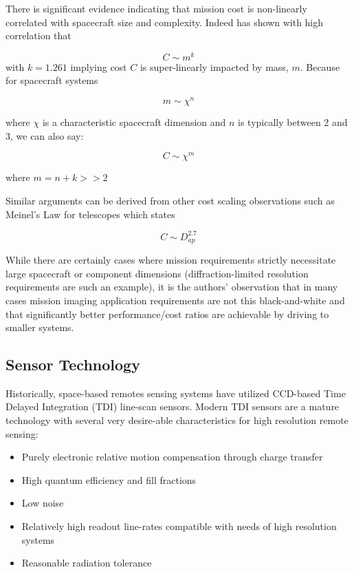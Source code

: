 \documentclass[10pt,journal]{IEEEtran}  %
\begin{document}
There is significant evidence indicating that mission cost is non-linearly correlated with spacecraft size and complexity.  Indeed \cite{bearden} has shown with high correlation that 

$$C \sim m^k$$
with $k=1.261$ implying cost $C$ is super-linearly impacted by mass, $m$.  Because for spacecraft systems

$$m \sim \chi^n$$

where $\chi$ is a characteristic spacecraft dimension and $n$ is typically between 2 and 3, we can also say:

\begin{equation}
C \sim \chi^m
\end{equation}

where $m = n + k >> 2$

Similar arguments can be derived from other cost scaling observations such as Meinel's Law for telescopes which states

$$C \sim D_{ap}^{2.7}$$

While there are certainly cases where mission requirements strictly necessitate large spacecraft or component dimensions (diffraction-limited resolution requirements are such an example), it is the authors' observation that in many cases mission imaging application requirements are not this black-and-white and that significantly better performance/cost ratios are achievable by driving to smaller systems.

\subsection{Sensor Technology}
\label{sec:sensor_trends}

Historically, space-based remotes sensing systems have utilized CCD-based Time Delayed Integration (TDI) line-scan sensors.  Modern TDI sensors are a mature technology with several very desire-able characteristics for high resolution remote sensing:

\begin{itemize}
    \item Purely electronic relative motion compensation through charge transfer
    \item High quantum efficiency and fill fractions
    \item Low noise
    \item Relatively high readout line-rates compatible with needs of high resolution systems
    \item Reasonable radiation tolerance
\end{itemize}
\end{document}
